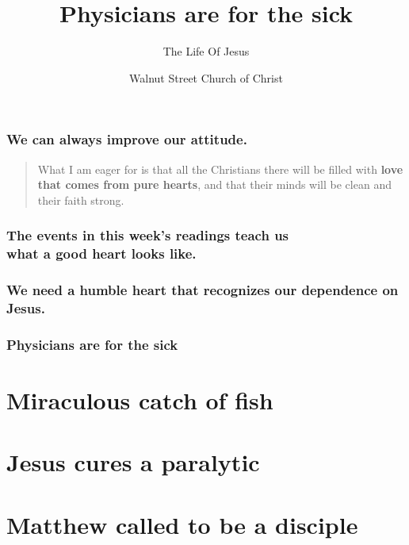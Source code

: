 \documentclass{beamer}
\title{Physicians are for the sick}
\subtitle{The Life Of Jesus}
\author[WSCOC]{Walnut Street Church of Christ}
\date[March 02, 2014]
\begin{document}
\frame{\titlepage}

\begin{frame}
\frametitle{}
\end{frame}

\begin{frame}
\frametitle{We can always improve our attitude.}

\begin{verse}
\begin{altverse}
What I am eager for is that all the Christians there will be filled with \textbf{love that comes from pure hearts}, and that their minds will be clean and their faith strong.
\end{altverse}
\end{verse}
\end{frame}

\begin{frame}
\frametitle{The events in this week's readings teach us\\what a good heart looks like.}
\end{frame}

\begin{frame}
\frametitle{We need a humble heart that recognizes our dependence on Jesus.}
\end{frame}

\begin{frame}
\frametitle{Physicians are for the sick}
\tableofcontents[currentsection]
\end{frame}

\section{Miraculous catch of fish}
\begin{frame}

\end{frame}
\section{Jesus cures a paralytic}

\section{Matthew called to be a disciple}
\end{document}
